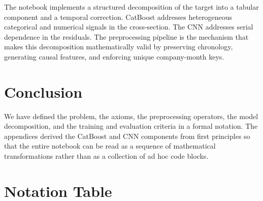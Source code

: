 \documentclass[11pt]{article}
\newcommand{\1}{\mathbf{1}}
\begin{document}
The notebook implements a structured decomposition of the target into a tabular component and a temporal correction. CatBoost addresses heterogeneous categorical and numerical signals in the cross-section. The CNN addresses serial dependence in the residuals. The preprocessing pipeline is the mechanism that makes this decomposition mathematically valid by preserving chronology, generating causal features, and enforcing unique company-month keys.

\section{Conclusion}

We have defined the problem, the axioms, the preprocessing operators, the model decomposition, and the training and evaluation criteria in a formal notation. The appendices derived the CatBoost and CNN components from first principles so that the entire notebook can be read as a sequence of mathematical transformations rather than as a collection of ad hoc code blocks.






\section{Notation Table}
\end{document}
